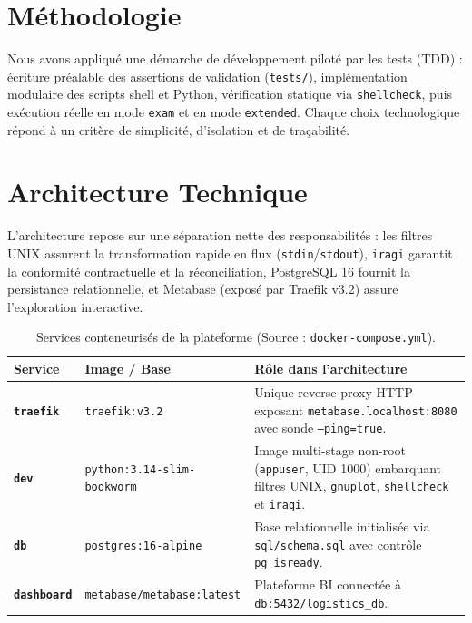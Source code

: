 \documentclass[11pt,a4paper]{article}
\begin{document}
\section{M\'ethodologie}
Nous avons appliqu\'e une d\'emarche de d\'eveloppement pilot\'e par les tests (TDD) : \'ecriture pr\'ealable des assertions de validation (\texttt{tests/}), impl\'ementation modulaire des scripts shell et Python, v\'erification statique via \texttt{shellcheck}, puis ex\'ecution r\'eelle en mode \texttt{exam} et en mode \texttt{extended}. Chaque choix technologique r\'epond \`a un crit\`ere de simplicit\'e, d'isolation et de tra\c{c}abilit\'e.

\section{Architecture Technique}
L'architecture repose sur une s\'eparation nette des responsabilit\'es : les filtres UNIX assurent la transformation rapide en flux (\texttt{stdin}/\texttt{stdout}), \texttt{iragi} garantit la conformit\'e contractuelle et la r\'econciliation, PostgreSQL 16 fournit la persistance relationnelle, et Metabase (expos\'e par Traefik v3.2) assure l'exploration interactive.

\begin{table}[H]
\centering
\small
\begin{tabularx}{\textwidth}{@{}>{\bfseries}p{2.3cm} p{4.6cm} X@{}}
\toprule
\rowcolor{slatebg} Service & Image / Base & R\^ole dans l'architecture \\
\midrule
\texttt{traefik} & \texttt{traefik:v3.2} & Unique reverse proxy HTTP exposant \texttt{metabase.localhost:8080} avec sonde \texttt{--ping=true}. \\
\rowcolor{rowalt} \texttt{dev} & {\footnotesize\texttt{python:3.14-slim-bookworm}} & Image multi-stage non-root (\texttt{appuser}, UID 1000) embarquant filtres UNIX, \texttt{gnuplot}, \texttt{shellcheck} et \texttt{iragi}. \\
\texttt{db} & \texttt{postgres:16-alpine} & Base relationnelle initialis\'ee via \texttt{sql/schema.sql} avec contr\^ole \texttt{pg\_isready}. \\
\rowcolor{rowalt} \texttt{dashboard} & \texttt{metabase/metabase:latest} & Plateforme BI connect\'ee \`a \texttt{db:5432/logistics\_db}. \\
\bottomrule
\end{tabularx}
\caption{Services conteneuris\'es de la plateforme (Source : \texttt{docker-compose.yml}).}
\end{table}
\end{document}
